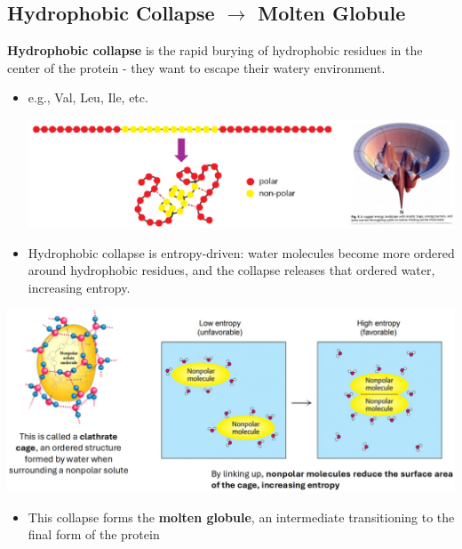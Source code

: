 \documentclass[10pt]{article}
\begin{document}
\subsection*{Hydrophobic Collapse $\rightarrow$ Molten Globule}
\textbf{Hydrophobic collapse} is the rapid burying of hydrophobic residues in the center of the protein - they want to escape their watery environment.
\begin{itemize}
    \item e.g., Val, Leu, Ile, etc.
    \begin{center}
        \includegraphics*[width=\textwidth]{L1_2.png}
    \end{center}
    \item Hydrophobic collapse is entropy-driven: water molecules become more ordered around hydrophobic residues, and the collapse releases that ordered water, increasing entropy.
\end{itemize}
\begin{center}
    \includegraphics*[width=\textwidth]{L1_3.png}
\end{center}
\begin{itemize}
    \item This collapse forms the \textbf{molten globule}, an intermediate transitioning to the final form of the protein
\end{itemize}
\end{document}

